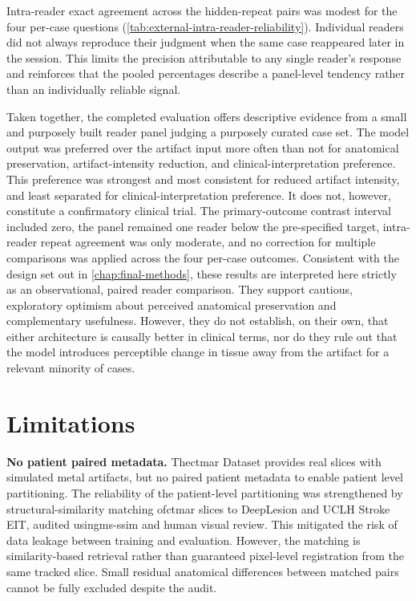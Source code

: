 Intra-reader exact agreement across the hidden-repeat pairs was modest for the four per-case questions (\autoref{tab:external-intra-reader-reliability}). Individual readers did not always reproduce their judgment when the same case reappeared later in the session. This limits the precision attributable to any single reader's response and reinforces that the pooled percentages describe a panel-level tendency rather than an individually reliable signal.

Taken together, the completed evaluation offers descriptive evidence from a small and purposely built reader panel judging a purposely curated case set. The model output was preferred over the artifact input more often than not for anatomical preservation, artifact-intensity reduction, and clinical-interpretation preference. This preference was strongest and most consistent for reduced artifact intensity, and least separated for clinical-interpretation preference. It does not, however, constitute a confirmatory clinical trial. The primary-outcome contrast interval included zero, the panel remained one reader below the pre-specified target, intra-reader repeat agreement was only moderate, and no correction for multiple comparisons was applied across the four per-case outcomes. Consistent with the design set out in \autoref{chap:final-methods}, these results are interpreted here strictly as an observational, paired reader comparison. They support cautious, exploratory optimism about perceived anatomical preservation and complementary usefulness. However, they do not establish, on their own, that either architecture is causally better in clinical terms, nor do they rule out that the model introduces perceptible change in tissue away from the artifact for a relevant minority of cases.

\section{Limitations}

\textbf{No patient paired metadata.} The\acrshort{ctmar} Dataset provides real slices with simulated metal artifacts, but no paired patient metadata to enable patient level partitioning. The reliability of the patient-level partitioning was strengthened by structural-similarity matching of\acrshort{ctmar} slices to DeepLesion and UCLH Stroke EIT, audited using\acrshort{ms-ssim} and human visual review. This mitigated the risk of data leakage between training and evaluation. However, the matching is similarity-based retrieval rather than guaranteed pixel-level registration from the same tracked slice. Small residual anatomical differences between matched pairs cannot be fully excluded despite the audit.

